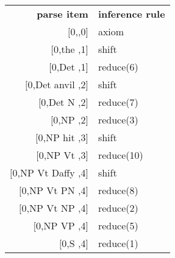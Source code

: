 \begin{examplebox}
    \phantom{a}
    \begin{center}
        \begin{tabular}{r|l}
            \textbf{parse item} & \textbf{inference rule}\\
            $\lbrack$0,\psep,0]             & axiom\\
            $\lbrack$0,the \psep,1]         & shift\\
            $\lbrack$0,Det \psep,1]         & reduce(6)\\
            $\lbrack$0,Det anvil \psep,2]   & shift\\
            $\lbrack$0,Det N \psep,2]       & reduce(7)\\
            $\lbrack$0,NP \psep,2]          & reduce(3)\\
            $\lbrack$0,NP hit \psep,3]      & shift\\
            $\lbrack$0,NP Vt \psep,3]       & reduce(10)\\
            $\lbrack$0,NP Vt Daffy \psep,4] & shift\\
            $\lbrack$0,NP Vt PN \psep,4]    & reduce(8)\\
            $\lbrack$0,NP Vt NP \psep,4]    & reduce(2)\\
            $\lbrack$0,NP VP \psep,4]       & reduce(5)\\
            $\lbrack$0,S \psep,4]           & reduce(1)
        \end{tabular}
    \end{center}
\end{examplebox}
%
